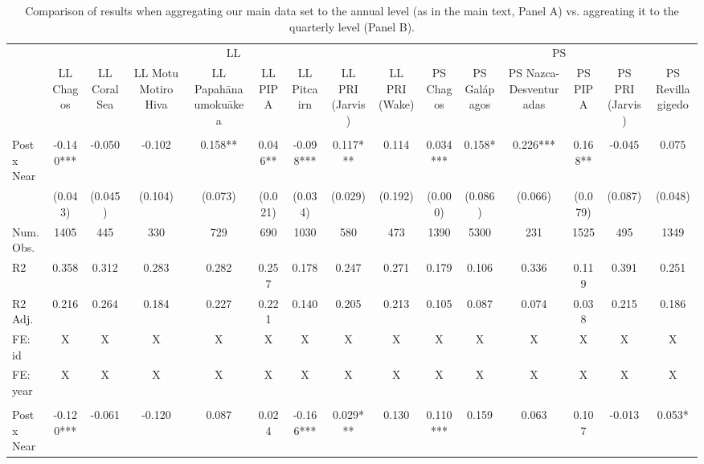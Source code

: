 \begin{table}

\caption{Comparison of results when aggregating our main data set to the annual level (as in the main text, Panel A) vs. aggreating it to the quarterly level (Panel B).}
\centering
\begin{tabular}[t]{lcccccccccccccc}
\toprule
\multicolumn{1}{c}{ } & \multicolumn{8}{c}{LL} & \multicolumn{6}{c}{PS} \\
\cmidrule(l{3pt}r{3pt}){2-9} \cmidrule(l{3pt}r{3pt}){10-15}
 & LL Chagos & LL Coral Sea & LL Motu Motiro Hiva & LL Papahānaumokuākea & LL PIPA & LL Pitcairn & LL PRI (Jarvis) & LL PRI (Wake) & PS Chagos & PS Galápagos & PS Nazca-Desventuradas & PS PIPA & PS PRI (Jarvis) & PS Revillagigedo\\
\midrule
\addlinespace[0.3em]
\multicolumn{15}{l}{Panel A: Aggregating data to the year-flag level (form main text)}\\
\hspace{1em}Post x Near & -0.140*** & -0.050 & -0.102 & 0.158** & 0.046** & -0.098*** & 0.117*** & 0.114 & 0.034*** & 0.158* & 0.226*** & 0.168** & -0.045 & 0.075\\
\hspace{1em} & (0.043) & (0.045) & (0.104) & (0.073) & (0.021) & (0.034) & (0.029) & (0.192) & (0.000) & (0.086) & (0.066) & (0.079) & (0.087) & (0.048)\\
\hspace{1em}Num.Obs. & 1405 & 445 & 330 & 729 & 690 & 1030 & 580 & 473 & 1390 & 5300 & 231 & 1525 & 495 & 1349\\
\hspace{1em}R2 & 0.358 & 0.312 & 0.283 & 0.282 & 0.257 & 0.178 & 0.247 & 0.271 & 0.179 & 0.106 & 0.336 & 0.119 & 0.391 & 0.251\\
\hspace{1em}R2 Adj. & 0.216 & 0.264 & 0.184 & 0.227 & 0.221 & 0.140 & 0.205 & 0.213 & 0.105 & 0.087 & 0.074 & 0.038 & 0.215 & 0.186\\
\hspace{1em}FE: id & X & X & X & X & X & X & X & X & X & X & X & X & X & \vphantom{1} X\\
\hspace{1em}FE: year & X & X & X & X & X & X & X & X & X & X & X & X & X & \vphantom{1} X\\
\addlinespace[0.5cm]
\multicolumn{15}{l}{Panel B: Aggregatign data to tye year-quarter-flag level}\\
\hspace{1em}Post x Near & -0.120*** & -0.061 & -0.120 & 0.087 & 0.024 & -0.166*** & 0.029*** & 0.130 & 0.110*** & 0.159 & 0.063 & 0.107 & -0.013 & 0.053*\\

\end{tabular}
\end{table}
